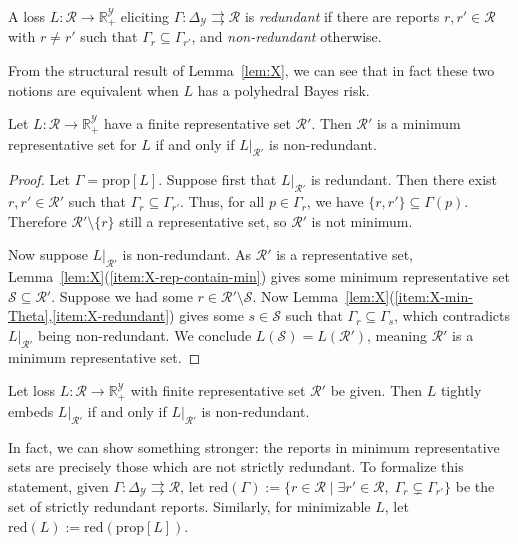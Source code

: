 \documentclass[twoside,11pt]{article}
\newcommand{\reals}{\mathbb{R}}
\newcommand{\prop}[1]{\mathrm{prop}[#1]}
\newcommand{\simplex}{\Delta_\Y}
\newcommand{\R}{\mathcal{R}}
\newcommand{\Sc}{\mathcal{S}}
\newcommand{\Y}{\mathcal{Y}}
\newcommand{\toto}{\rightrightarrows}
\newcommand{\red}{\mathrm{red}}
\begin{document}
\begin{definition}\label{def:nonredundant}
  A loss $L : \R \to \reals^\Y_+$ eliciting $\Gamma:\simplex \toto \R$ is \emph{redundant} if there are reports $r, r' \in \R$ with $r \neq r'$ such that $\Gamma_r \subseteq \Gamma_{r'}$, and \emph{non-redundant} otherwise.
\end{definition}

From the structural result of Lemma~\ref{lem:X}, we can see that in fact these two notions are equivalent when $L$ has a polyhedral Bayes risk.
\begin{proposition}\label{prop:tfae-min-rep-nonredundant}
  Let $L:\R\to\reals^\Y_+$ have a finite representative set $\R'$.
  Then $\R'$ is a minimum representative set for $L$ if and only if $L|_{\R'}$ is non-redundant.
\end{proposition}
\begin{proof}
  Let $\Gamma = \prop{L}$.
  Suppose first that $L|_{\R'}$ is redundant.
  Then there exist $r,r' \in \R'$ such that $\Gamma_r \subseteq \Gamma_{r'}$.
  Thus, for all $p \in \Gamma_r$, we have $\{r, r'\} \subseteq \Gamma(p)$.
  Therefore $\R' \setminus \{r\}$ still a representative set, so $\R'$ is not minimum.

  Now suppose $L|_{\R'}$ is non-redundant.
  As $\R'$ is a representative set, Lemma~\ref{lem:X}(\ref{item:X-rep-contain-min}) gives some minimum representative set $\Sc \subseteq \R'$.
  Suppose we had some $r \in \R' \setminus \Sc$.
  Now Lemma~\ref{lem:X}(\ref{item:X-min-Theta},\ref{item:X-redundant}) gives some $s\in\Sc$ such that $\Gamma_r \subseteq \Gamma_s$, which contradicts $L|_{\R'}$ being non-redundant.
  We conclude $L(\Sc)=L(\R')$, meaning $\R'$ is a minimum representative set.
\end{proof}

\begin{corollary}\label{cor:tight-embed-min-rep}
  Let loss $L:\R\to\reals^\Y_+$ with finite representative set $\R'$ be given.
  Then $L$ tightly embeds $L|_{\R'}$ if and only if $L|_{\R'}$ is non-redundant.
\end{corollary}

In fact, we can show something stronger: the reports in minimum representative sets are precisely those which are not strictly redundant.
To formalize this statement, given $\Gamma : \simplex \toto \R$, let $\red(\Gamma) := \{r\in\R \mid \exists r'\in\R,\; \Gamma_r \subsetneq \Gamma_{r'}\}$ be the set of strictly redundant reports.
Similarly, for minimizable $L$, let $\red(L) := \red(\prop L)$.
\end{document}
